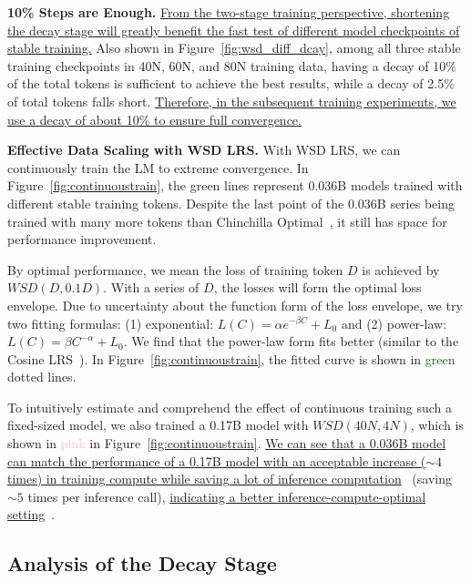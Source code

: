 \textbf{10\% Steps are Enough.} \uline{From the two-stage training perspective, shortening the decay stage will greatly benefit the fast test of different model checkpoints of stable training.} Also shown in Figure~\ref{fig:wsd_diff_dcay}, among all three stable training checkpoints in 40N, 60N, and 80N training data, having a decay of 10\% of the total tokens is sufficient to achieve the best results, while a decay of 2.5\% of total tokens falls short. \uline{Therefore, in the subsequent training experiments, we use a decay of about 10\% to ensure full convergence.}

\textbf{Effective Data Scaling with WSD LRS.} With WSD LRS, we can continuously train the LM to extreme convergence. In Figure~\ref{fig:continuoustrain}, the green lines represent 0.036B models trained with different stable training tokens. Despite the last point of the 0.036B series being trained with many more tokens than Chinchilla Optimal~\citep{hoffmann2022training}, it still has space for performance improvement. 


By optimal performance, we mean the loss of training token $D$ is achieved by ${WSD}(D, 0.1D)$. With a series of $D$, the losses will form the optimal loss envelope. Due to uncertainty about the function form of the loss envelope, we try two fitting formulas: (1) exponential: $L(C) = \alpha e^{-\beta C} + L_0$ and (2) power-law: $L(C) = \beta C^{-\alpha} + L_0$. We find that the power-law form fits better (similar to the Cosine LRS~\citep{kaplan2020scaling}). In Figure~\ref{fig:continuoustrain}, the fitted curve is shown in \textcolor{darkgreen}{green} dotted lines.

To intuitively estimate and comprehend the effect of continuous training such a fixed-sized model, we also trained a 0.17B model with $WSD(40N, 4N)$, which is shown in \textcolor{pink}{pink} in Figure~\ref{fig:continuoustrain}. \uline{We can see that a 0.036B model can match the performance of a 0.17B model with an acceptable increase ($\sim 4$ times) in training compute while saving a lot of inference computation}~\citep{sardana2023beyond} (saving $\sim 5$ times per inference call), \uline{indicating a better inference-compute-optimal setting}~\citep{sardana2023beyond}.

\subsection{Analysis of the Decay Stage}

